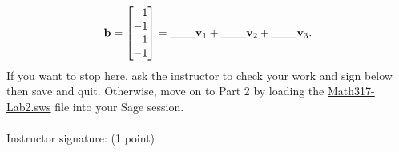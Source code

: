 \documentclass[fleqn,11pt]{paper}
\theoremstyle{remark}
\renewcommand{\vec}[1]{\mathbf{#1}}
\newcommand{\<}{\ensuremath{\langle}}
\renewcommand{\>}{\ensuremath{\rangle}}
\newcommand\vb{\vec{b}}
\newcommand\vv{\vec{v}}
\begin{document}
\vskip5mm
\[
  \vb = \begin{bmatrix*}[r] 1 \\ -1 \\ 1 \\ -1\end{bmatrix*}= \text{\underline{\phantom{XXX}}}\vv_1 + \text{\underline{\phantom{XXX}}} \vv_2+
\text{\underline{\phantom{XXX}}} \vv_3.
\]
\vskip5mm
\noindent  If you want to stop here, ask the instructor to check your work and sign below
then save and quit. Otherwise, move on to Part 2 by loading the \href{https://github.com/williamdemeo/Math317-Spring2016/raw/master/computerlab/Math317-Lab2.sws}{Math317-Lab2.sws} file into your 
Sage session.
    \\\\
    Instructor signature: \underline{\phantom{XXXXXXXXXXXXXXXXXXXXXXXXXXXXXXXX}} (1 point)
\end{document}
